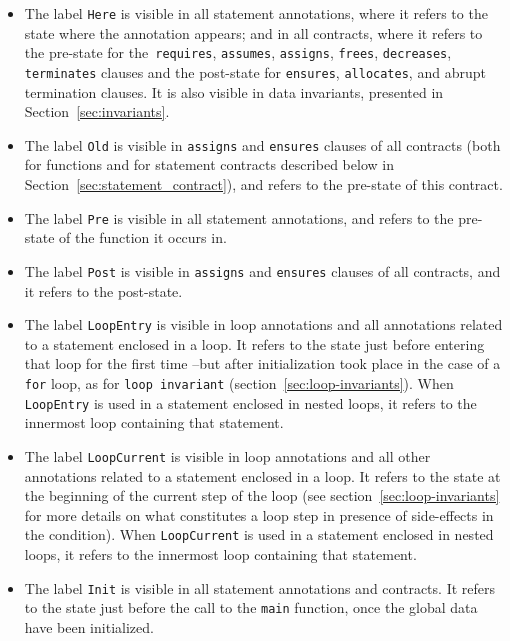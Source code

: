 \begin{itemize}

\item The label \lstinline|Here| is visible in all statement annotations,
  where it refers to the state where the annotation appears; and in
  all contracts, where it refers to the pre-state for
  the~\lstinline|requires|, \lstinline|assumes|, \lstinline|assigns|,
  \lstinline|frees|,
  \lstinline|decreases|,
  \lstinline|terminates|
  clauses and the post-state for
  \lstinline|ensures|, \lstinline|allocates|, and abrupt termination
  clauses.
It is also visible in data invariants, presented in Section~\ref{sec:invariants}.
\item The label \lstinline|Old| is visible in \lstinline|assigns| and
  \lstinline|ensures| clauses of all contracts (both for functions and for
  statement contracts described below in
  Section~\ref{sec:statement_contract}), and refers to the pre-state
  of this contract.
\item The label \lstinline|Pre| is visible in all statement annotations,
  and refers to the pre-state of the function it occurs in.
\item The label \lstinline|Post| is visible in
\lstinline|assigns| and \lstinline|ensures| clauses of all contracts,
and it refers to the post-state.

\item The label \lstinline|LoopEntry|
is visible in loop annotations and
all annotations related to a statement enclosed in a loop.
It refers to the state just before entering that loop
for the first time --but after initialization took place in the case of a
\lstinline|for| loop, as for \lstinline|loop invariant|
(section~\ref{sec:loop-invariants}). When \lstinline|LoopEntry| is used in a
statement enclosed in nested loops, it
refers to the innermost loop containing that statement.

\item The label \lstinline|LoopCurrent|
is visible in loop annotations and
all other annotations related to a statement enclosed in a loop.
It refers to the state at the beginning of the current step of the loop (see
section~\ref{sec:loop-invariants} for more details on what constitutes a loop
step in presence of side-effects in the condition). When
\lstinline|LoopCurrent| is used in a statement enclosed in nested loops, it
refers to the innermost loop containing that statement.

\item The label \lstinline|Init| is visible in all statement annotations and
contracts. It refers to the state just before the call to the \lstinline|main|
function, once the global data have been initialized.
\end{itemize}

